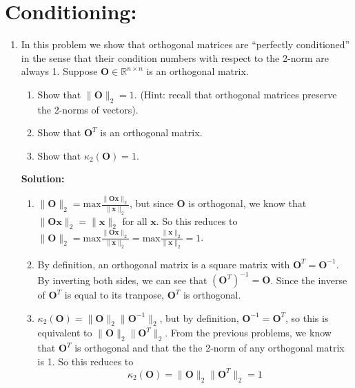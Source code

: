 \documentclass[]{article}
\newcommand{\R}{\mathbb{R}}				%
\newcommand{\x}{\bm{x}}					%
\newcommand{\vmax}{\mathrm{max}}		%
\newcommand{\solution}{\vskip 0.5cm \textbf{\large Solution:} \\}
\begin{document}
    \section*{Conditioning:}
    \begin{enumerate}[resume]
	\item In this problem we show that orthogonal matrices are ``perfectly conditioned'' in the sense that their condition numbers with respect to the 2-norm are always 1. Suppose $\bm{O}\in\R^{n\times n}$ is an orthogonal matrix.
	  \begin{enumerate}
	  \item Show that $\|\bm{O}\|_2=1$. (Hint: recall that orthogonal matrices preserve the 2-norms of vectors).
	  \item Show that $\bm{O}^T$ is an orthogonal matrix.
	  \item Show that $\kappa_2(\bm{O})=1$.
	  \end{enumerate}

	  \solution
	  \begin{enumerate}
	  \item $\|\bm{O}\|_2 = \vmax \frac{\|\bm{O}\x\|_2}{\|\x\|_2}$, but
        since $\bm{O}$ is orthogonal, we know that $\|\bm{O}\x\|_2 =
        \|\x\|_2$ for all $\x$. So this reduces to $\|\bm{O}\|_2 = \vmax
        \frac{\|\bm{O}\x\|_2}{\|\x\|_2} = \vmax
        \frac{\|\x\|_2}{\|\x\|_2} = 1$.

	  \item By definition, an orthogonal matrix is a square matrix
        with $\bm{O}^T = \bm{O}^{-1}$. By inverting both sides, we can
        see that $(\bm{O}^T)^{-1} = \bm{O}$. Since the inverse of
        $\bm{O}^T$ is equal to its tranpose, $\bm{O}^T$ is orthogonal.

	  \item $\kappa_2(\bm{O}) = \|\bm{O}\|_2 \|\bm{O}^{-1}\|_2$, but
        by definition, $\bm{O}^{-1} = \bm{O}^T$, so this is equivalent
        to $\|\bm{O}\|_2 \|\bm{O}^T\|_2$. From the previous problems,
        we know that $\bm{O}^T$ is orthogonal and that the the 2-norm
        of any orthogonal matrix is 1. So this reduces to
        $$\kappa_2(\bm{O}) = \|\bm{O}\|_2 \|\bm{O}^T\|_2 = 1$$
	  \end{enumerate}
    \end{enumerate}
\end{document}

